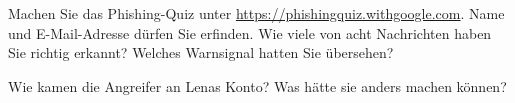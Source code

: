 \begin{mychallenge}
	Machen Sie das Phishing-Quiz unter \url{https://phishingquiz.withgoogle.com}. Name und E-Mail-Adresse dürfen Sie erfinden.
	Wie viele von acht Nachrichten haben Sie richtig erkannt? Welches Warnsignal hatten Sie übersehen?
	\schreibzeile
\end{mychallenge}

\begin{fallakte}[-- Station B]
	Wie kamen die Angreifer an Lenas Konto? Was hätte sie anders machen können?
	\schreibzeile
	\schreibzeile
	\schreibzeile
\end{fallakte}
